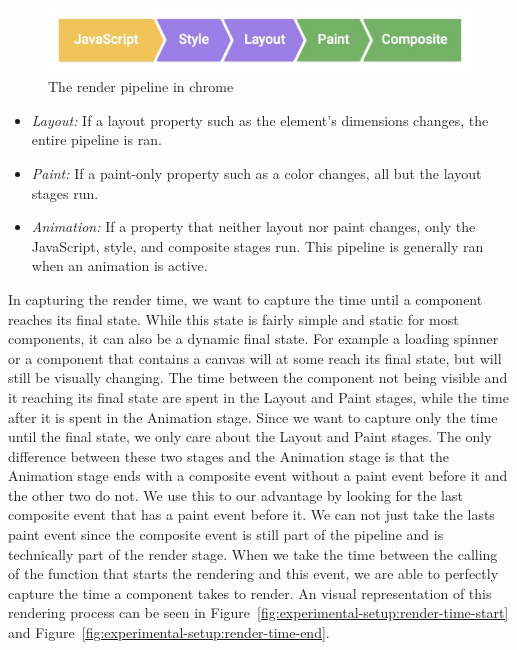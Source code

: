 \begin{figure}[h]
	\includegraphics[width=\columnwidth]{figures/experimental-setup/render-pipeline.jpg}
	\caption{The render pipeline in chrome}
	\label{fig:experimental-setup:pipeline}
	\centering
\end{figure}

\begin{itemize}
	\item \emph{Layout:} If a layout property such as the element's dimensions changes, the entire pipeline is ran.
	\item \emph{Paint:} If a paint-only property such as a color changes, all but the layout stages run.
	\item \emph{Animation:} If a property that neither layout nor paint changes, only the JavaScript, style, and composite stages run. This pipeline is generally ran when an animation is active.
\end{itemize}

In capturing the render time, we want to capture the time until a component reaches its final state. While this state is fairly simple and static for most components, it can also be a dynamic final state. For example a loading spinner or a component that contains a canvas will at some reach its final state, but will still be visually changing. The time between the component not being visible and it reaching its final state are spent in the Layout and Paint stages, while the time after it is spent in the Animation stage. Since we want to capture only the time until the final state, we only care about the Layout and Paint stages. The only difference between these two stages and the Animation stage is that the Animation stage ends with a composite event without a paint event before it and the other two do not. We use this to our advantage by looking for the last composite event that has a paint event before it. We can not just take the lasts paint event since the composite event is still part of the pipeline and is technically part of the render stage. When we take the time between the calling of the function that starts the rendering and this event, we are able to perfectly capture the time a component takes to render. An visual representation of this rendering process can be seen in Figure~\ref{fig:experimental-setup:render-time-start} and Figure~\ref{fig:experimental-setup:render-time-end}.

